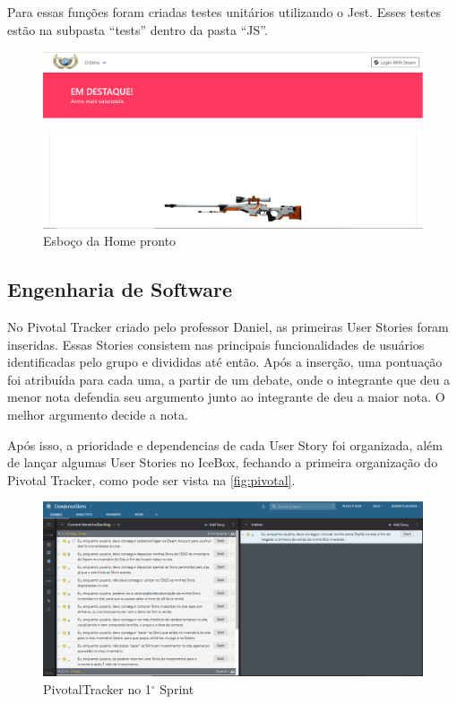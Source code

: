 Para essas funções foram criadas testes unitários utilizando o Jest. Esses testes estão na subpasta ``tests'' 
dentro da pasta ``JS''.\\

\begin{figure}[!htb]
	\centering
	\includegraphics[scale=0.5]{Imagens/Home.png}
	\caption{Esboço da Home pronto}
	\label{fig:home}
\end{figure}

\subsection{Engenharia de Software}
No Pivotal Tracker criado pelo professor Daniel, as primeiras User Stories foram inseridas. Essas Stories consistem 
nas principais funcionalidades de usuários identificadas pelo grupo e divididas até então. Após a inserção, 
uma pontuação foi atribuída para cada uma, a partir de um debate, onde o integrante que deu a menor nota defendia seu argumento 
junto ao integrante de deu a maior nota. O melhor argumento decide a nota.

Após isso, a prioridade e dependencias de cada User Story foi organizada, além de lançar algumas User Stories no IceBox, fechando a primeira organização do Pivotal Tracker, como pode ser vista na \autoref{fig:pivotal}.\\

\begin{figure}[!htb]
	\centering
	\includegraphics[scale=0.4]{Imagens/Pivotal1.png}
	\caption{PivotalTracker no 1$^{\circ}$ Sprint}
	\label{fig:pivotal}
\end{figure}

